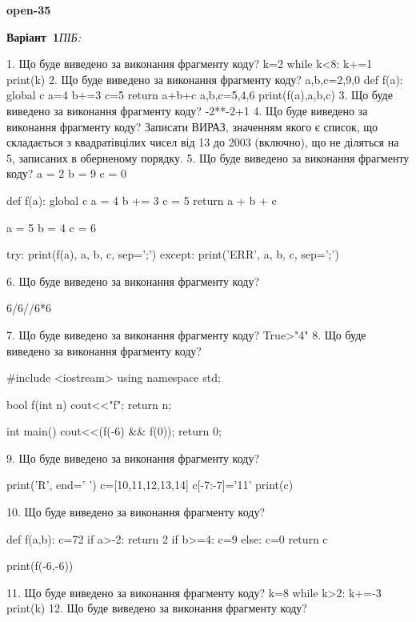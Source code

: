 \documentclass[11pt]{article}
\begin{document}
{\large\textbf{open-35}}

\textbf{Варіант \No\,1}\hfill \textit{ПІБ:}\,\underline{\hspace{60mm}}
\vspace{4mm}

1. Що буде виведено за виконання фрагменту коду?
k=2
   while k<8: k+=1
   print(k)
2. Що буде виведено за виконання фрагменту коду?
a,b,c=2,9,0
   def f(a):
     global c     a=4
     b+=3
     c=5
     return a+b+c
   a,b,c=5,4,6
   print(f(a),a,b,c)
3. Що буде виведено за виконання фрагменту коду?
-2**-2+1
4. Що буде виведено за виконання фрагменту коду?
Записати ВИРАЗ, значенням якого є список, що складається з квадратівцілих чисел від 13 до 2003 (включно), що не діляться на 5, записаних в оберненому порядку.
5. Що буде виведено за виконання фрагменту коду?
a = 2
b = 9
c = 0

def f(a):
global c    a = 4
    b += 3
    c = 5
    return a + b + c

a = 5
b = 4
c = 6

try:
    print(f(a), a, b, c, sep=';')
except:
    print('ERR', a, b, c, sep=';')

6. Що буде виведено за виконання фрагменту коду?

6/6//6*6

7. Що буде виведено за виконання фрагменту коду?
True>"4"
8. Що буде виведено за виконання фрагменту коду?

#include <iostream>
using namespace std;

bool f(int n){
    cout<<"f";
    return n;
}

int main(){
    cout<<(f(-6) && f(0));
    return 0;
}

9. Що буде виведено за виконання фрагменту коду?

print('R', end=' ')
c=[10,11,12,13,14]
c[-7:-7]='11'
print(c)


10. Що буде виведено за виконання фрагменту коду?

def f(a,b):
    c=72
    if a>-2:
        return 2
    if b>=4:
         c=9
    else: 
        c=0
    return c

print(f(-6,-6))

11. Що буде виведено за виконання фрагменту коду?
k=8
   while k>2: k+=-3
   print(k)
12. Що буде виведено за виконання фрагменту коду?
\end{document}
